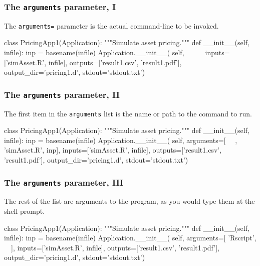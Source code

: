 \documentclass[english,serif,mathserif,xcolor=pdftex,dvipsnames,table]{beamer}
\begin{document}
\begin{frame}[fragile]
  \frametitle{The \texttt{arguments} parameter, I}

  The \texttt{arguments=} parameter is the actual command-line to be invoked.

  \+
\begin{python}
class PricingApp1(Application):
  """Simulate asset pricing."""
  def __init__(self, infile):
    inp = basename(infile)
    Application.__init__(
      self,
      ~\HL{arguments=[}~
        ~\HL{"Rscript", "simAsset.R", inp],}~
      inputs=['simAsset.R', infile],
      outputs=['result1.csv', 'result1.pdf'],
      output_dir='pricing1.d',
      stdout='stdout.txt')
\end{python}
\end{frame}

\begin{frame}[fragile]
\frametitle{The \texttt{arguments} parameter, II}

The first item in the \texttt{arguments} list is the name or path to the command to run.

  \+
\begin{python}
class PricingApp1(Application):
  """Simulate asset pricing."""
  def __init__(self, infile):
    inp = basename(infile)
    Application.__init__(
      self,
      arguments=[
        ~~, 'simAsset.R', inp],
      inputs=['simAsset.R', infile],
      outputs=['result1.csv', 'result1.pdf'],
      output_dir='pricing1.d',
      stdout='stdout.txt')
\end{python}
\end{frame}

\begin{frame}[fragile]
\frametitle{The \texttt{arguments} parameter, III}

The rest of the list are arguments to the program, as you would type
them at the shell prompt.

  \+
\begin{python}
class PricingApp1(Application):
  """Simulate asset pricing."""
  def __init__(self, infile):
    inp = basename(infile)
    Application.__init__(
      self,
      arguments=[
        'Rscript', ~~],
      inputs=['simAsset.R', infile],
      outputs=['result1.csv', 'result1.pdf'],
      output_dir='pricing1.d',
      stdout='stdout.txt')
\end{python}
\end{frame}
\end{document}
